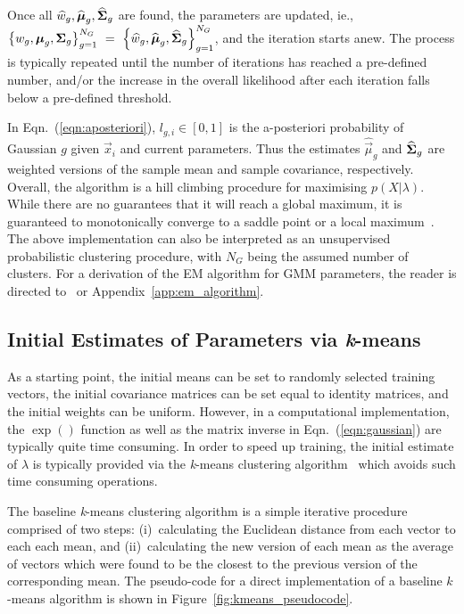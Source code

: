 \noindent
Once all $\widehat{w}_g, \widehat{{\boldsymbol{\mu}}}_g, \widehat{{\boldsymbol{\Sigma}}}_g$ are found, the parameters are updated,
ie., $\left\{ w_g, {\boldsymbol{\mu}}_g, {\boldsymbol{\Sigma}}_g \right\}_{g=1}^{N_G} ~ = ~ \left\{ \widehat{w}_g, \widehat{{\boldsymbol{\mu}}}_g, \widehat{{\boldsymbol{\Sigma}}}_g \right\}_{g=1}^{N_G}$,
and the iteration starts anew.
The process is typically repeated until the number of iterations has reached a pre-defined number,
and/or the increase in the overall likelihood after each iteration falls below a pre-defined threshold.

\noindent In Eqn.~(\ref{eqn:aposteriori}), $l_{g,i} \in [0,1]$ is the {a-posteriori} probability of Gaussian $g$ given $\Vec{x}_i$ and current parameters.
Thus the estimates $\widehat{\Vec{\mu}}_g$ and $\widehat{{\boldsymbol{\Sigma}}}_g$ are weighted versions of the
sample mean and sample covariance, respectively.
Overall, the algorithm is a hill climbing procedure for maximising $p(X | \lambda)$.
While there are no guarantees that it will reach a global maximum, it is guaranteed to monotonically converge to a saddle point or a local maximum~\cite{Dempster77,Duda01,Mitchell97}.
The above implementation can also be interpreted as an unsupervised probabilistic clustering procedure,
with $N_G$ being the assumed number of clusters.
For a derivation of the EM algorithm for GMM parameters, the reader is directed to~\cite{Bilmes98,Redner84} or Appendix~\ref{app:em_algorithm}.

\subsection{Initial Estimates of Parameters via {\it k}-means}
\label{sec:initial_estimate}

As a starting point, the initial means can be set to randomly selected training vectors,
the initial covariance matrices can be set equal to identity matrices, 
and the initial weights can be uniform.
However, in a computational implementation, the $\exp()$ function as well as the matrix inverse in Eqn.~(\ref{eqn:gaussian}) are typically quite time consuming.
In order to speed up training, the initial estimate of $\lambda$ is typically provided via the {\it k}-means clustering algorithm~\cite{Bishop_2006,Duda01,Kulis_2012}
which avoids such time consuming operations.

The baseline {\it k}-means clustering algorithm is a simple iterative procedure comprised of two steps:
(i)~calculating the Euclidean distance from each vector to each each mean,
and
(ii)~calculating the new version of each mean as the average of vectors which were found to be the closest to the previous version of the corresponding mean.
The pseudo-code for a direct implementation of a baseline $k$-means algorithm is shown in Figure~\ref{fig:kmeans_pseudocode}.


